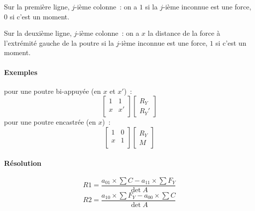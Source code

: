 \documentclass[draft]{report}
\begin{document}
Sur la première ligne, $j$-ième colonne~: on a $1$ si la $j$-ième inconnue est une force, $0$ si c'est un moment.

Sur la deuxième ligne, $j$-ième colonne~: on a $x$ la distance de la force à l'extrémité gauche de la poutre si la $j$-ième inconnue est une force, $1$ si c'est un moment.

\paragraph{Exemples} pour une poutre bi-appuyée (en $x$ et $x'$)~:
\[ \begin{bmatrix}
1 & 1 \\
x & x' \\
\end{bmatrix}
\begin{bmatrix}
R_Y \\
R_Y'
\end{bmatrix}\]
pour une poutre encastrée (en $x$)~:
\[ \begin{bmatrix}
1 & 0 \\
x & 1 \\
\end{bmatrix} 
\begin{bmatrix}
R_Y \\
M
\end{bmatrix}\]

\paragraph{Résolution}


\[ R1 = \dfrac{ a_{01} \times \sum C - a_{11} \times \sum F_Y }{\det A} \]
\[ R2 = \dfrac{ a_{10} \times \sum F_Y - a_{00} \times \sum C }{\det A} \]



\end{document}
